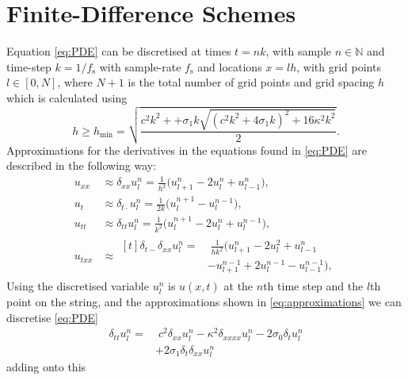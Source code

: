 \documentclass[twoside,a4paper]{article}
\begin{document}
\section{Finite-Difference Schemes}
Equation \eqref{eq:PDE} can be discretised at times $t = nk$, with sample $n \in \mathbb{N}$ and time-step $k = 1 / f_\text{s}$ with sample-rate $f_\text{s}$ and locations $x = lh$, with grid points $l \in [0,N]$, where $N + 1$ is the total number of grid points and grid spacing $h$ which is calculated using 
\begin{equation}
    h \geq h_\text{min} = \sqrt{\frac{c^2k^2+ + \sigma_1k\sqrt{(c^2k^2+4\sigma_1k)^2+16\kappa^2k^2}}{2}}.
\end{equation}
Approximations for the derivatives in the equations found in \ref{eq:PDE} are described in the following way: 
\begin{subequations}\label{eq:approximations}
    \begin{align}
        \label{eq:secondSpacex}
        u_{xx} &\approx \delta_{xx}u_l^n = \frac{1}{h^2}\big(u_{l+1}^n - 2u_l^n + u_{l-1}^n\big),\\
        \label{eq:centerTime}
        u_{t} &\approx \delta_{t\cdot} u^n_l = \frac{1}{2k}\big(u_l^{n+1}-u_l^{n-1}\big),\\
        \label{eq:secondTime}
        u_{tt} &\approx \delta_{tt}u_l^n = \frac{1}{k^2} \big(u_l^{n+1} - 2u_l^n + u_l^{n-1}\big),\\
        u_{txx} &\approx 
        \begin{aligned}[t]\delta_{t-}\delta_{xx}u_l^n =& \; \frac{1}{hk^2}\big(u_{l+1}^n - 2u_l^2 + u_{l-1}^n \\
        &- u_{l+1}^{n-1} + 2u_l^{n-1} - u_{l-1}^{n-1}\big),
        \end{aligned}
    \end{align}
\end{subequations}
Using the discretised variable $u_l^n$ is $u(x,t)$ at the $n$th time step and the $l$th point on the string, and the approximations shown in \eqref{eq:approximations} we can discretise \eqref{eq:PDE}
\begin{equation}
  \begin{aligned}
    \delta_{tt}u_l^n =& \; c^2\delta_{xx}u_l^n-\kappa^2\delta_{xxxx}u_l^n-2\sigma_0\delta_t u_l^n \\
    &+ 2\sigma_1 \delta_t\delta_{xx}u_l^n
  \end{aligned}
\end{equation}
adding onto this
\end{document}

